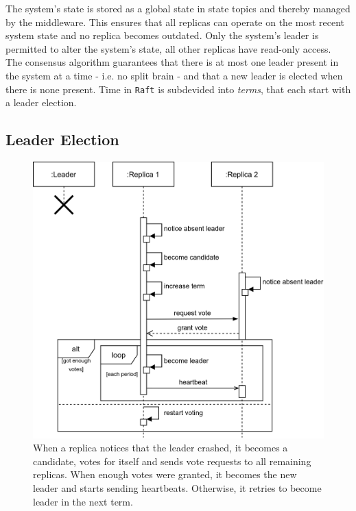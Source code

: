 The system's state is stored as a global state in  state topics and thereby managed by the middleware.
This ensures that all replicas can operate on the most recent system state and no replica becomes outdated.
Only the system's leader is permitted to alter the system's state, all other replicas have read-only access.
\\

The consensus algorithm guarantees that there is at most one leader present in the system at a time - i.e. no split brain - and that a new leader is elected when there is none present.
Time in \texttt{Raft} is subdevided into \textit{terms}, that each start with a leader election.

\subsection{Leader Election}
\begin{figure}[!hb]
	\centering
	\includegraphics[width=0.75\linewidth]{images/sequence/LeaderElection}
	\caption{When a replica notices that the leader crashed, it becomes a candidate, votes for itself and sends vote requests to all remaining replicas. When enough votes were granted, it becomes the new leader and starts sending heartbeats. Otherwise, it retries to become leader in the next term.}
	\label{fig:SeqLeaderElection}
\end{figure}

